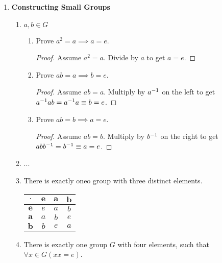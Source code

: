 \begin{enumerate}[label={\Alph*.},font={\bfseries}]
\begin{enumerate}[label={\arabic*},font={\bfseries}]
\begin{proof}
    \end{proof}
  \end{enumerate}
\item {\bf Constructing Small Groups}
  \begin{enumerate}[label={\arabic*},font={\bfseries}]
  \item $a,b \in G$
    \begin{enumerate}[label={(\alph*)},font={\bfseries}]
    \item Prove $a^2 = a \implies a = e$.
      \begin{proof}
        Assume $a^2 = a$. Divide by $a$ to get $a = e$.
      \end{proof}
    \item Prove $ab = a \implies b = e$.
      \begin{proof}
        Assume $ab = a$.
        Multiply by $a^{-1}$ on the left to get ${a^{-1}}ab = {a^{-1}}a \equiv b = e$.
      \end{proof}
    \item Prove $ab = b \implies a = e$.
      \begin{proof}
        Assume $ab = b$.
        Multiply by $b^{-1}$ on the right to get $ab{b^{-1}} = b^{-1} \equiv a = e$.
      \end{proof}
    \end{enumerate}
  \item ...
  \item There is exactly oneo group with three distinct elements.
    \begin{tabular}{ c | c c c }
      $\cdot$ & $\mathbf{e}$ & $\mathbf{a}$ & $\mathbf{b}$ \\
      \hline
      $\mathbf{e}$ & $e$ & $a$ & $b$ \\
      $\mathbf{a}$ & $a$ & $b$ & $e$ \\
      $\mathbf{b}$ & $b$ & $e$ & $a$
    \end{tabular}
    \newpage
  \item There is exactly one group $G$ with four elements, such that $\forall x \in G (xx = e)$.

\end{enumerate}
\end{enumerate}
